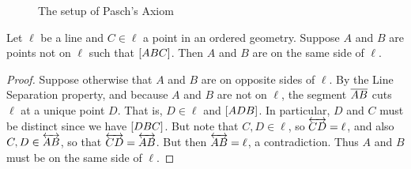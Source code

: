 \begin{figure}[h]
\begin{center}
\caption{\label{fig:pasch}The setup of Pasch's Axiom}
\end{center}
\end{figure}

\begin{lem}
Let \(\ell\) be a line and \(C \in \ell\) a point in an ordered geometry.
Suppose \(A\) and \(B\) are points not on \(\ell\) such that \([ A B C ]\).
Then \(A\) and \(B\) are on the same side of \(\ell\).
\end{lem}

\begin{proof}
Suppose otherwise that \(A\) and \(B\) are on opposite sides of \(\ell\).
By the Line Separation property, and because \(A\) and \(B\) are not on \(\ell\), the segment \(\overline{AB}\) cuts \(\ell\) at a unique point \(D\).
That is, \(D \in \ell\) and \([ A D B ]\).
In particular, \(D\) and \(C\) must be distinct since we have \([ D B C ]\).
But note that \(C, D \in \ell\), so \(\overleftrightarrow{CD} = \ell\), and also \(C, D \in \overleftrightarrow{AB}\), so that \(\overleftrightarrow{CD} = \overleftrightarrow{AB}\).
But then \(\overleftrightarrow{AB} = \ell\), a contradiction.
Thus \(A\) and \(B\) must be on the same side of \(\ell\).
\end{proof}

\Exercises%
